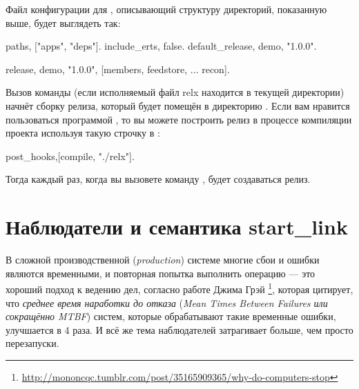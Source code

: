 Файл конфигурации для , описывающий структуру директорий, показанную выше, будет выглядеть так:

\begin{VerbatimText}
{paths, ["apps", "deps"]}.
{include_erts, false}. %
{default_release, demo, "1.0.0"}.

{release, {demo, "1.0.0"},
    [members,
     feedstore,
     ...
     recon]}.
\end{VerbatimText}

Вызов команды  (если исполняемый файл relx находится в текущей директории) начнёт сборку релиза, который будет помещён в директорию . Если вам нравится пользоваться программой , то вы можете построить релиз в процессе компиляции проекта используя такую строчку в :

\begin{VerbatimText}
{post_hooks,[{compile, "./relx"}]}.
\end{VerbatimText}

Тогда каждый раз, когда вы вызовете команду , будет создаваться релиз.

\section{Наблюдатели и семантика start\_link}
\label{sec:supervisors-and-start-link-semantics}

В сложной производственной (\emph{production}) системе многие сбои и ошибки являются временными, и повторная попытка выполнить операцию --- это хороший подход к ведению дел, согласно работе Джима Грэй \footnote{\href{http://mononcqc.tumblr.com/post/35165909365/why-do-computers-stop}{http://mononcqc.tumblr.com/post/35165909365/why-do-computers-stop}}, которая цитирует, что \emph{среднее время наработки до отказа} (\emph{Mean Times Between Failures или сокращённо MTBF}) систем, которые обрабатывают такие временные ошибки, улучшается в 4 раза. И всё же тема наблюдателей затрагивает больше, чем просто перезапуски.

